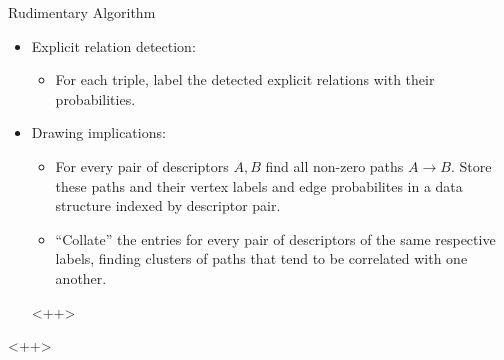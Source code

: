 \documentclass[a4paper]{article}
\begin{document}
Rudimentary Algorithm
\begin{itemize}
    \item Explicit relation detection:
    \begin{itemize}
        \item For each triple, label the detected explicit relations with their
            probabilities.
    \end{itemize}
    \item Drawing implications:
    \begin{itemize}
        \item For every pair of descriptors $A, B$ find all non-zero paths $A
            \rightarrow B$. Store these paths and their vertex labels and edge
            probabilites in a data structure indexed by descriptor pair.
        \item ``Collate'' the entries for every pair of descriptors of the same
            respective labels, finding clusters of paths that tend to be
            correlated with one another.
    \end{itemize}<++>
\end{itemize}<++>

%
%
\end{document}
